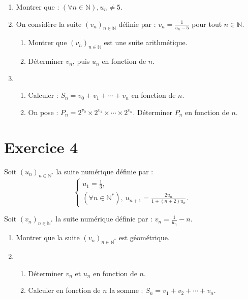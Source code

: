 \documentclass[a4paper,11pt]{article}
\begin{document}
\begin{enumerate}
    \item Montrer que : \((\forall n \in \mathbb{N}), u_n \neq 5\).

    \item On considère la suite \((v_n)_{n \in \mathbb{N}}\) définie par : \(v_n = \frac{1}{u_n - 5}\) pour tout \(n \in \mathbb{N}\).
    \begin{enumerate}
        \item Montrer que \((v_n)_{n \in \mathbb{N}}\) est une suite arithmétique.
        \item Déterminer \(v_n\), puis \(u_n\) en fonction de \(n\).
    \end{enumerate}

    \item 
    \begin{enumerate}
        \item Calculer : \(S_n = v_0 + v_1 + \cdots + v_n\) en fonction de \(n\).
        \item On pose : \(P_n = 2^{v_0} \times 2^{v_1} \times \cdots \times 2^{v_n}\). Déterminer \(P_n\) en fonction de \(n\).
    \end{enumerate}
\end{enumerate}

\section*{Exercice 4}

Soit \((u_n)_{n \in \mathbb{N}^*}\) la suite numérique définie par :
\[
\begin{cases}
u_1 = \frac{1}{3}, \\
(\forall n \in \mathbb{N}^*), \ u_{n+1} = \frac{2u_n}{1 + (n+2)u_n}.
\end{cases}
\]

Soit \((v_n)_{n \in \mathbb{N}^*}\) la suite numérique définie par : \(v_n = \frac{1}{u_n} - n\).

\begin{enumerate}
    \item Montrer que la suite \((v_n)_{n \in \mathbb{N}^*}\) est géométrique.

    \item 
    \begin{enumerate}
        \item Déterminer \(v_n\) et \(u_n\) en fonction de \(n\).
        \item Calculer en fonction de \(n\) la somme : \(S_n = v_1 + v_2 + \cdots + v_n\).
    \end{enumerate}
\end{enumerate}
\end{document}
